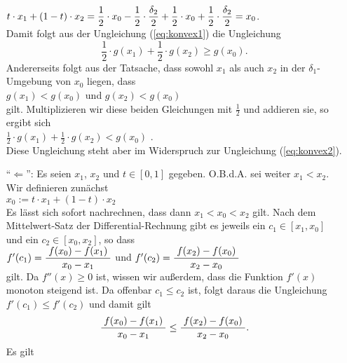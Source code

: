 \begin{enumerate}
  $\displaystyle t \cdot x_1 + (1-t) \cdot x_2 = 
   \frac{1}{2} \cdot x_0 - \frac{1}{2} \cdot\frac{\delta_2}{2} + 
   \frac{1}{2} \cdot x_0 + \frac{1}{2} \cdot\frac{\delta_2}{2}
   = x_0
  $.
  \\[0.2cm]
  Damit folgt aus der Ungleichung (\ref{eq:konvex1}) die Ungleichung
  \begin{equation}
    \label{eq:konvex2}    
  \frac{1}{2} \cdot g(x_1) + \frac{1}{2} \cdot g(x_2) \geq g(x_0).
  \end{equation} 
  Andererseits folgt aus der Tatsache, dass sowohl $x_1$ als auch $x_2$ in der $\delta_1$-Umgebung von $x_0$
  liegen, dass
  \\[0.2cm]
  \hspace*{1.3cm}
  $g(x_1) < g(x_0)$ \quad und \quad  $g(x_2) < g(x_0)$
  \\[0.2cm]
  gilt. Multiplizieren wir diese beiden Gleichungen mit $\frac{1}{2}$ und addieren sie, so ergibt sich
  \\[0.2cm]
  \hspace*{1.3cm}
  $\frac{1}{2} \cdot g(x_1) + \frac{1}{2} \cdot g(x_2) < g(x_0)$ .
  \\[0.2cm]
  Diese Ungleichung steht aber im Widerspruch zur Ungleichung (\ref{eq:konvex2}).
\item[``$\Leftarrow$'':]  Es seien $x_1$, $x_2$ und $t \in [0,1]$ gegeben.  O.B.d.A. sei weiter
  $x_1 < x_2$. Wir definieren zun\"achst
  \\[0.2cm]
  \hspace*{1.3cm}
  $x_0 := t \cdot x_1 + (1 - t) \cdot x_2$
  \\[0.2cm]
  Es l\"asst sich sofort nachrechnen, dass dann $x_1 < x_0 < x_2$ gilt.  Nach dem Mittelwert-Satz der
  Differential-Rechnung gibt es jeweils ein $c_1 \in [x_1,x_0]$ und ein $c_2 \in [x_0,x_2]$, so dass
  \\[0.2cm]
  \hspace*{1.3cm}
  $f'(c_1) = \displaystyle\frac{\;\displaystyle f(x_0) - f(x_1)\;}{\;\displaystyle x_0 - x_1\;}$  \quad und \quad
  $f'(c_2) = \displaystyle\frac{\;\displaystyle f(x_2) - f(x_0)\;}{\;\displaystyle x_2 - x_0\;}$  
  \\[0.2cm]
  gilt.  Da $f''(x) \geq 0$ ist, wissen wir au{\ss}erdem, dass die Funktion $f'(x)$ monoton steigend ist.
  Da offenbar $c_1 \leq c_2$ ist, folgt daraus die Ungleichung $f'(c_1) \leq f'(c_2)$ und damit gilt
  \begin{equation}
    \label{eq:konvex3}
    \displaystyle\frac{\;\displaystyle f(x_0) - f(x_1)\;}{\;\displaystyle x_0 - x_1\;} \leq \displaystyle\frac{\;\displaystyle f(x_2) - f(x_0)\;}{\;\displaystyle x_2 - x_0\;}.    
  \end{equation}
  Es gilt
  \\[-0.2cm]

\end{enumerate}
